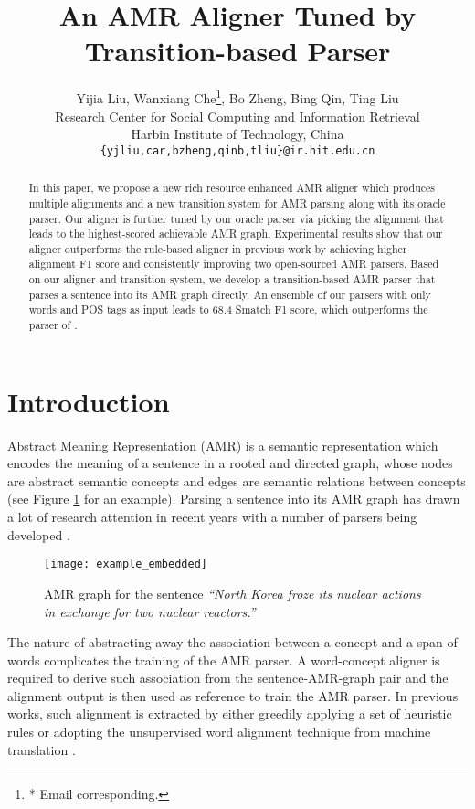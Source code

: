 \documentclass[11pt,a4paper]{article}
\title{An AMR Aligner Tuned by Transition-based Parser}
\author{Yijia Liu, Wanxiang Che\thanks{* Email corresponding.}, Bo Zheng, Bing Qin, Ting Liu \\
	Research Center for Social Computing and Information Retrieval \\
	Harbin Institute of Technology, China \\
	{\tt \{yjliu,car,bzheng,qinb,tliu\}@ir.hit.edu.cn}	
}
\date{}
\begin{document}
\maketitle
\begin{abstract}
In this paper, we propose a new rich resource
enhanced AMR aligner which produces multiple
alignments and a new transition system for AMR parsing
along with its oracle parser.
Our aligner is further tuned by
our oracle parser via picking the alignment that
leads to the highest-scored achievable AMR graph.
Experimental results show that our aligner outperforms the rule-based aligner in previous work
by achieving higher alignment F1 score and consistently improving two open-sourced AMR parsers.
Based on our aligner and transition system, 
we develop a transition-based AMR parser that parses a sentence into its AMR graph directly.
An ensemble of our parsers with only words and POS tags as input
leads to 68.4 Smatch F1 score,
which outperforms the parser of \citet{wang-xue:2017:EMNLP2017}.
\end{abstract}

\section{Introduction}\label{sec:intro}

Abstract Meaning Representation (AMR) \cite{banarescu-EtAl:2013:LAW7-ID}
is a semantic representation which encodes the meaning of a sentence
in a rooted and directed graph, 
whose nodes are abstract semantic concepts and edges are semantic relations between concepts
(see Figure \ref{fig:eg_amr} for an example).
Parsing a sentence into its AMR graph has
drawn a lot of research attention in recent years
with a number of parsers being developed
\cite{flanigan-EtAl:2014:P14-1,
	wang-xue-pradhan:2015:NAACL-HLT,
	pust-EtAl:2015:EMNLP,
	artzi-lee-zettlemoyer:2015:EMNLP,
	peng-song-gildea:2015:CoNLL,
	zhou-EtAl:2016:EMNLP20163,
	goodman-vlachos-naradowsky:2016:P16-1,
	damonte-cohen-satta:2017:EACLlong,
	ballesteros-alonaizan:2017:EMNLP2017,
	foland-martin:2017:Long,
	konstas-EtAl:2017:Long}.

\begin{figure}[t]
	\texttt{[image: example\_embedded]}
	\caption{AMR graph for the sentence \textit{``North Korea froze its nuclear actions in exchange for two nuclear reactors.''}}
	\label{fig:eg_amr}
\end{figure}

The nature of abstracting away the association between a concept 
and a span of words complicates the training of the AMR parser.
A word-concept aligner is required to
derive such association from the sentence-AMR-graph pair and 
the alignment output is then used as reference to train the AMR parser.
In previous works, such alignment is extracted
by either greedily applying a set of heuristic rules
\citep{flanigan-EtAl:2014:P14-1}
or adopting the unsupervised word alignment technique from
machine translation \citep{pourdamghani-EtAl:2014:EMNLP2014,wang-xue:2017:EMNLP2017}.
\end{document}
